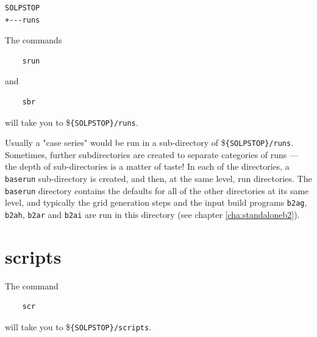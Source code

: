 \documentclass[a4paper,10pt]{report}
\begin{document}
\begin{verbatim}
SOLPSTOP
+---runs
\end{verbatim}

The commands
\begin{verbatim}
    srun
\end{verbatim}
and
\begin{verbatim}
    sbr
\end{verbatim}
will take you to \${\tt \{SOLPSTOP\}/runs}.

Usually a "case series" would be run in a sub-directory of
\${\tt \{SOLPSTOP\}/runs}.  Sometimes, further subdirectories are created to
separate categories of runs --- the depth of sub-directories is a
matter of taste!  In each of the directories, a {\tt baserun}
sub-directory is created, and then, at the same level, run directories.
The {\tt baserun}
directory contains the defaults for all of the other directories at
its same level, and typically the grid generation steps and the input build programs
{\tt b2ag}, {\tt b2ah}, {\tt b2ar}
and {\tt b2ai} are run in this directory (see chapter \ref{cha:standaloneb2}).

\newpage\section{scripts}
\label{sec:scripts}

The command
\begin{verbatim}
    scr
\end{verbatim}
will take you to \${\tt \{SOLPSTOP\}/scripts}.
\end{document}

